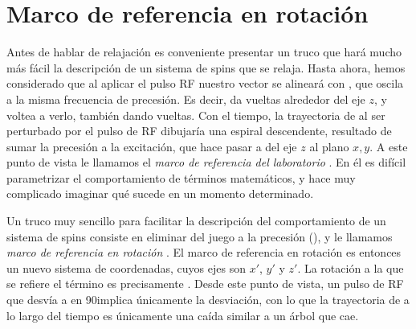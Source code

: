 \section{Marco de referencia en rotación}
Antes de hablar de relajación es conveniente presentar un truco que hará mucho más fácil la descripción de un sistema de spins que se relaja. Hasta ahora, hemos considerado que al aplicar el pulso RF nuestro vector \M se alineará con \Bone, que oscila a la misma frecuencia de precesión. Es decir, \Bone da vueltas alrededor del eje $z$, y \M voltea a verlo, también dando vueltas. Con el tiempo, la trayectoria de \M al ser perturbado por el pulso de RF dibujaría una espiral descendente, resultado de sumar la precesión a la excitación, que hace pasar a \M del eje $z$ al plano $x,y$. A este punto de vista le llamamos el \textit{marco de referencia del laboratorio} . En él es difícil parametrizar el comportamiento de \M términos matemáticos, y hace muy complicado imaginar qué sucede en un momento determinado. 

Un truco muy sencillo para facilitar la descripción del comportamiento de un sistema de spins consiste en eliminar del juego a la precesión (\omegazero), y le llamamos \textit{marco de referencia en rotación} . El marco de referencia en rotación es entonces un nuevo sistema de coordenadas, cuyos ejes son $x'$, $y'$ y $z'$. La rotación a la que se refiere el término es precisamente \omegazero.  Desde este punto de vista, un pulso de RF que desvía a \M en 90\degrees implica únicamente la desviación, con lo que la trayectoria de \M a lo largo del tiempo es únicamente una caída similar a un árbol que cae. 

